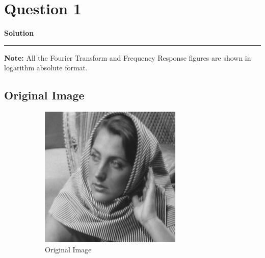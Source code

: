 \documentclass[a4paper]{article}
\title{\cooltitle{CS663 Assignment-3}}
\author{{\bf Saksham Rathi, Kavya Gupta, Shravan Srinivasa Raghavan} \\
\small Department of Computer Science, \\
Indian Institute of Technology Bombay \\}
\date{}
\newenvironment{solution}[2][]{%
    \begin{mdframed}[linecolor=green!60!black, linewidth=2pt, roundcorner=10pt, backgroundcolor=green!5!white, skipabove=12pt, skipbelow=12pt]%
        \textbf{\large #2} %
        \par\noindent\rule{\textwidth}{0.4pt} %
        \vspace{0.5em} %
}{%
    \end{mdframed}%
}
\begin{document}
\maketitle
\section*{Question 1}

\begin{solution}{Solution}
    \textbf{Note:} All the Fourier Transform and Frequency Response figures are shown in logarithm absolute format.

    \subsection*{Original Image}
    \begin{figure}[H]
        \begin{subfigure}{.45\textwidth}
        \centering
          \includegraphics[width=1\linewidth]{../images/barbara256.png}
          \caption{Original Image}
        \end{subfigure}
        \begin{subfigure}{.5\textwidth}
        \centering

\end{subfigure}
\end{figure}
\end{solution}
\end{document}
